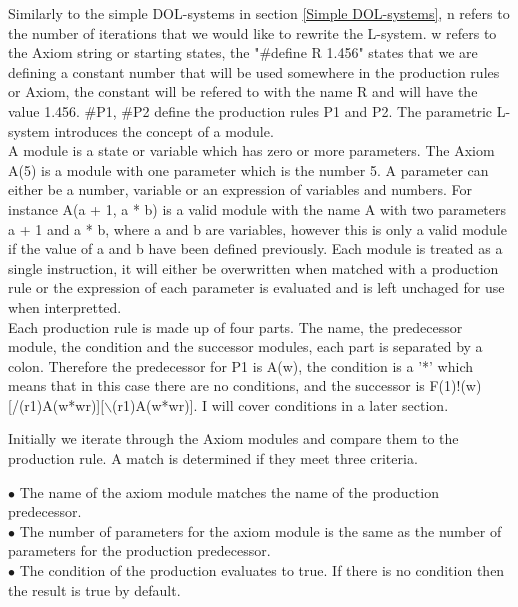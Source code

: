\begin{flushleft}
Similarly to the simple DOL-systems in section \ref{Simple DOL-systems}, n refers to the number of iterations that we would like to rewrite the L-system. w refers to the Axiom string or starting states, the "\#define R 1.456" states that we are defining a constant number that will be used somewhere in the production rules or Axiom, the constant will be refered to with the name R and will have the value 1.456. \#P1, \#P2 define the production rules P1 and P2. The parametric L-system introduces the concept of a module.\\
A module is a state or variable which has zero or more parameters. The Axiom A(5) is a module with one parameter which is the number 5. A parameter can either be a number, variable or an expression of variables and numbers. For instance A(a + 1, a * b) is a valid module with the name A with two parameters a + 1 and a * b, where a and b are variables, however this is only a valid module if the value of a and b have been defined previously. Each module is treated as a single instruction, it will either be overwritten when matched with a production rule or the expression of each parameter is evaluated and is left unchaged for use when interpretted.\\
Each production rule is made up of four parts. The name, the predecessor module, the condition and the successor modules, each part is separated by a colon. Therefore the predecessor for P1 is A(w), the condition is a '*' which means that in this case there are no conditions, and the successor is F(1)!(w)[/(r1)A(w*wr)][$\backslash$(r1)A(w*wr)]. I will cover conditions in a later section.\\

\vspace{5mm}

Initially we iterate through the Axiom modules and compare them to the production rule. A match is determined if they meet three criteria.\\

\vspace{5mm}

$\bullet$ The name of the axiom module matches the name of the production predecessor. \\
$\bullet$ The number of parameters for the axiom module is the same as the number of parameters for the production predecessor. \\
$\bullet$ The condition of the production evaluates to true. If there is no condition then the result is true by default.\\

\end{flushleft}








